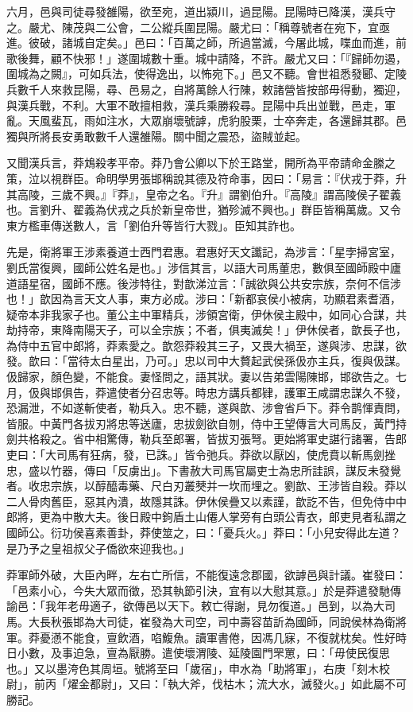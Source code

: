 \begin{pinyinscope}
六月，邑與司徒尋發雒陽，欲至宛，道出潁川，過昆陽。昆陽時已降漢，漢兵守之。嚴尤、陳茂與二公會，二公縱兵圍昆陽。嚴尤曰：「稱尊號者在宛下，宜亟進。彼破，諸城自定矣。」邑曰：「百萬之師，所過當滅，今屠此城，喋血而進，前歌後舞，顧不快邪！」遂圍城數十重。城中請降，不許。嚴尤又曰：「『歸師勿遏，圍城為之闕』，可如兵法，使得逸出，以怖宛下。」邑又不聽。會世祖悉發郾、定陵兵數千人來救昆陽，尋、邑易之，自將萬餘人行陳，敕諸營皆按部毋得動，獨迎，與漢兵戰，不利。大軍不敢擅相救，漢兵乘勝殺尋。昆陽中兵出並戰，邑走，軍亂。天風蜚瓦，雨如注水，大眾崩壞號謼，虎豹股栗，士卒奔走，各還歸其郡。邑獨與所將長安勇敢數千人還雒陽。關中聞之震恐，盜賊並起。

又聞漢兵言，莽鴆殺孝平帝。莽乃會公卿以下於王路堂，開所為平帝請命金縢之策，泣以視群臣。命明學男張邯稱說其德及符命事，因曰：「易言：『伏戎于莽，升其高陵，三歲不興。』『莽』，皇帝之名。『升』謂劉伯升。『高陵』謂高陵侯子翟義也。言劉升、翟義為伏戎之兵於新皇帝世，猶殄滅不興也。」群臣皆稱萬歲。又令東方檻車傳送數人，言「劉伯升等皆行大戮」。臣知其詐也。

先是，衛將軍王涉素養道士西門君惠。君惠好天文讖記，為涉言：「星孛掃宮室，劉氏當復興，國師公姓名是也。」涉信其言，以語大司馬董忠，數俱至國師殿中廬道語星宿，國師不應。後涉特往，對歆涕泣言：「誠欲與公共安宗族，奈何不信涉也！」歆因為言天文人事，東方必成。涉曰：「新都哀侯小被病，功顯君素耆酒，疑帝本非我家子也。董公主中軍精兵，涉領宮衛，伊休侯主殿中，如同心合謀，共劫持帝，東降南陽天子，可以全宗族；不者，俱夷滅矣！」伊休侯者，歆長子也，為侍中五官中郎將，莽素愛之。歆怨莽殺其三子，又畏大禍至，遂與涉、忠謀，欲發。歆曰：「當待太白星出，乃可。」忠以司中大贅起武侯孫伋亦主兵，復與伋謀。伋歸家，顏色變，不能食。妻怪問之，語其狀。妻以告弟雲陽陳邯，邯欲告之。七月，伋與邯俱告，莽遣使者分召忠等。時忠方講兵都肄，護軍王咸謂忠謀久不發，恐漏泄，不如遂斬使者，勒兵入。忠不聽，遂與歆、涉會省戶下。莽令鹊惲責問，皆服。中黃門各拔刃將忠等送廬，忠拔劍欲自刎，侍中王望傳言大司馬反，黃門持劍共格殺之。省中相驚傳，勒兵至郎署，皆拔刃張弩。更始將軍史諶行諸署，告郎吏曰：「大司馬有狂病，發，已誅。」皆令弛兵。莽欲以厭凶，使虎賁以斬馬劍挫忠，盛以竹器，傳曰「反虜出」。下書赦大司馬官屬吏士為忠所詿誤，謀反未發覺者。收忠宗族，以醇醯毒藥、尺白刃叢僰并一坎而埋之。劉歆、王涉皆自殺。莽以二人骨肉舊臣，惡其內潰，故隱其誅。伊休侯疊又以素謹，歆訖不告，但免侍中中郎將，更為中散大夫。後日殿中鉤盾土山僊人掌旁有白頭公青衣，郎吏見者私謂之國師公。衍功侯喜素善卦，莽使筮之，曰：「憂兵火。」莽曰：「小兒安得此左道？是乃予之皇祖叔父子僑欲來迎我也。」

莽軍師外破，大臣內畔，左右亡所信，不能復遠念郡國，欲謼邑與計議。崔發曰：「邑素小心，今失大眾而徵，恐其執節引決，宜有以大慰其意。」於是莽遣發馳傳諭邑：「我年老毋適子，欲傳邑以天下。敕亡得謝，見勿復道。」邑到，以為大司馬。大長秋張邯為大司徒，崔發為大司空，司中壽容苗訢為國師，同說侯林為衛將軍。莽憂懣不能食，亶飲酒，啗鰒魚。讀軍書倦，因馮几寐，不復就枕矣。性好時日小數，及事迫急，亶為厭勝。遣使壞渭陵、延陵園門罘罳，曰：「毋使民復思也。」又以墨洿色其周垣。號將至曰「歲宿」，申水為「助將軍」，右庚「刻木校尉」，前丙「燿金都尉」，又曰：「執大斧，伐枯木；流大水，滅發火。」如此屬不可勝記。


\end{pinyinscope}
